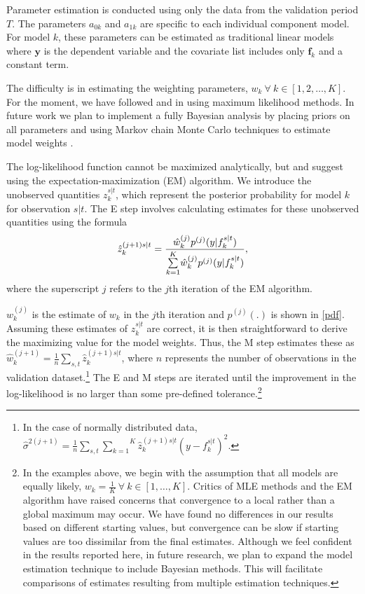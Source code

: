 \documentclass[12pt,fullpage,endnotes]{article}
\newcommand{\note}[1]{\footnote{ #1 \vspace{4 mm}}}
\begin{document}
Parameter estimation is conducted using only the data from the
validation period $T$.  The parameters $a_{0k}$ and $a_{1k}$ are
specific to each individual component model.  For model $k$, these
parameters can be estimated as traditional linear models where
$\mathbf{y}$ is the dependent variable and the covariate list includes
only $\mathbf{f}_k$ and a constant term.

The difficulty is in estimating the weighting parameters,
$w_k~\forall~ k \in [1, 2, \dots, K]$. For the moment, we have
followed \citet{Raftery:2005} and \citet{Sloughter:2007} in using
maximum likelihood methods. In future work we plan to implement a
fully Bayesian analysis by placing priors on all parameters and using
Markov chain Monte Carlo techniques to estimate model weights
\citep[c.f.][]{Vrugt:2008}.

The log-likelihood function cannot be maximized analytically, but
\citet{Raftery:2005} and \citet{Sloughter:2007} suggest using the
expectation-maximization (EM) algorithm.  We introduce the unobserved
quantities $z_{k}^{s|t}$, which represent the posterior probability for
model $k$ for observation $s |t $.  The E step involves calculating
estimates for these unobserved quantities using the formula
\begin{equation}
\small
\hat{z}^{(j+1)s|t}_{k} = \frac{\hat{w}^{(j)}_k
p^{(j)}(y|f_{k}^{s|t})}{\overset{K}{\underset{k=1}{\sum}}\hat{w}^{(j)}_kp^{(j)}(y|f_{k}^{s|t})},
\end{equation}
\noindent where the superscript $j$ refers to the $j$th iteration of
the EM algorithm.

$w_k^{(j)}$ is the estimate of $w_k$ in the $j$th iteration and
$p^{(j)}(.)$ is shown in \eqref{pdf}.  Assuming these estimates of
$z_{k}^{s|t}$ are correct, it is then straightforward to derive the
maximizing value for the model weights. Thus, the M step estimates
these as
$\hat{w}^{(j+1)}_k=\frac{1}{n}\underset{s,t}{\sum}\hat{z}^{(j+1)s|t}_{k}$,
where $n$ represents the number of observations in the validation
dataset.\note{In the case of normally distributed data,
  $\hat{\sigma}^{2(j+1)}=\frac{1}{n}\underset{s,t}{\sum}\overset{K}{\underset{k=1}{\sum}}\hat{z}^{(j+1)s|t}_{k}(y-f_{k}^{s|t})^2$.}
The E and M steps are iterated until the improvement in the
log-likelihood is no larger than some pre-defined tolerance.\note{In
  the examples above, we begin with the assumption that all models are
  equally likely, $w_k = \frac{1}{K} ~ \forall ~ k \in [1, \ldots,
  K]$.  Critics of MLE methods and the EM algorithm have raised
  concerns that convergence to a local rather than a global maximum
  may occur.  We have found no differences in our results based on
  different starting values, but convergence can be slow if starting
  values are too dissimilar from the final estimates.  Although we
  feel confident in the results reported here, in future research, we
  plan to expand the model estimation technique to include Bayesian
  methods.  This will facilitate comparisons of estimates resulting
  from multiple estimation techniques.}
\end{document}
